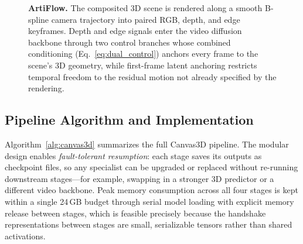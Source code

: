 \begin{figure}[t]
{}
    \caption{\textbf{ArtiFlow.} The composited 3D scene is rendered along a
    smooth B-spline camera trajectory into paired RGB, depth, and edge
    keyframes. Depth and edge signals enter the video diffusion backbone
    through two control branches whose combined conditioning
    (Eq.~\ref{eq:dual_control}) anchors every frame to the scene's 3D
    geometry, while first-frame latent anchoring restricts temporal
    freedom to the residual motion not already specified by the
    rendering.}
    \label{fig:artiflow}
\end{figure}

\subsection{Pipeline Algorithm and Implementation}
\label{sec:method:algo}

Algorithm~\ref{alg:canvas3d} summarizes the full Canvas3D pipeline. The
modular design enables \emph{fault-tolerant resumption}: each stage
saves its outputs as checkpoint files, so any specialist can be
upgraded or replaced without re-running downstream stages---for
example, swapping in a stronger 3D predictor or a different video
backbone. Peak memory consumption across all four stages is kept
within a single 24\,GB budget through serial model loading with
explicit memory release between stages, which is feasible precisely
because the handshake representations between stages are small,
serializable tensors rather than shared activations.

